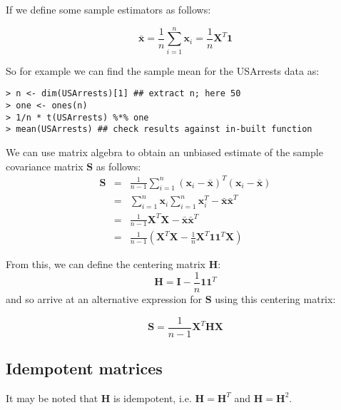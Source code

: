 If we define some sample estimators as follows:

\begin{equation}
\bar{\boldsymbol{x}} = \frac{1}{n} \sum_{i=1}^{n} \boldsymbol{x}_{i} = \frac{1}{n} \boldsymbol{X}^{T}\boldsymbol{1}
\end{equation}

So for example we can find the sample mean for the USArrests data as:
\singlespacing
\begin{verbatim}
> n <- dim(USArrests)[1] ## extract n; here 50
> one <- ones(n)
> 1/n * t(USArrests) %*% one
> mean(USArrests) ## check results against in-built function
\end{verbatim}
\onehalfspacing

We can use matrix algebra to obtain an unbiased estimate of the sample covariance matrix $\boldsymbol{S}$ as follows:
\begin{eqnarray*}
\boldsymbol{S} &=& \frac{1}{n-1} \sum_{i=1}^{n} (\boldsymbol{x}_{i} - \boldsymbol{\bar{x}})^{T} (\boldsymbol{x}_{i} - \boldsymbol{\bar{x}}) \\
&=&   \sum_{i=1}^{n} \boldsymbol{x}_{i} \sum_{i=1}^{n} \boldsymbol{x}_{i}^{T} - \boldsymbol{\bar{x}}  \boldsymbol{\bar{x}}^{T}\\
 &=& \frac{1}{n-1}\boldsymbol{X}^{T}\boldsymbol{X} - \boldsymbol{\bar{x}}  \boldsymbol{\bar{x}}^{T} \\
&=& \frac{1}{n-1} \left( \boldsymbol{X}^{T}\boldsymbol{X} - \frac{1}{n} \boldsymbol{X}^{T} \boldsymbol{1} \boldsymbol{1}^{T} \boldsymbol{X} \right)
\end{eqnarray*}

From this, we can define the centering matrix $\boldsymbol{H}$:
\begin{displaymath}
\boldsymbol{H} = \boldsymbol{I} - \frac{1}{n} \boldsymbol{1}\boldsymbol{1}^{T}
\end{displaymath}
and so arrive at an alternative expression for $\boldsymbol{S}$ using this centering matrix:

\begin{equation}
\boldsymbol{S} = \frac{1}{n-1}\boldsymbol{X}^{T}\boldsymbol{H} \boldsymbol{X}
\end{equation}

\subsection{Idempotent matrices}

It may be noted that $\boldsymbol{H}$ is idempotent, i.e.  $\boldsymbol{H} = \boldsymbol{H}^{T}$ and  $\boldsymbol{H} = \boldsymbol{H}^{2}$.

